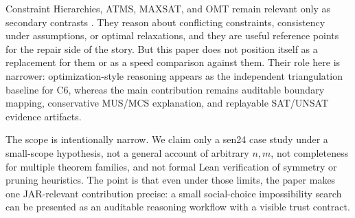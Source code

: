 Constraint Hierarchies, ATMS, MAXSAT, and OMT remain relevant only as secondary contrasts \citep{borning1992constraint,dekleer1986atms,bacchus2021maxsat,sebastiani2015omt}.
They reason about conflicting constraints, consistency under assumptions, or optimal relaxations, and they are useful reference points for the repair side of the story.
But this paper does not position itself as a replacement for them or as a speed comparison against them.
Their role here is narrower: optimization-style reasoning appears as the independent triangulation baseline for C6, whereas the main contribution remains auditable boundary mapping, conservative MUS/MCS explanation, and replayable SAT/UNSAT evidence artifacts.

The scope is intentionally narrow.
We claim only a sen24 case study under a small-scope hypothesis, not a general account of arbitrary $n,m$, not completeness for multiple theorem families, and not formal Lean verification of symmetry or pruning heuristics.
The point is that even under those limits, the paper makes one JAR-relevant contribution precise: a small social-choice impossibility search can be presented as an auditable reasoning workflow with a visible trust contract.
